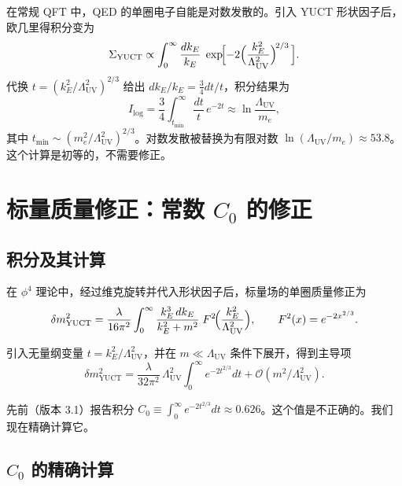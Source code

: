 \documentclass[11pt,a4paper]{article}
\newcommand{\LUV}{\Lambda_{\mathrm{UV}}}
\theoremstyle{remark}
\begin{document}
	在常规 QFT 中，QED 的单圈电子自能是对数发散的。引入 YUCT 形状因子后，欧几里得积分变为
	\begin{equation}
		\Sigma_{\mathrm{YUCT}} \propto \int_0^{\infty} \frac{dk_E}{k_E}\; \exp\!\Bigl[-2\Bigl(\frac{k_E^2}{\LUV^2}\Bigr)^{\!2/3}\,\Bigr].
		\label{eq:elec_int}
	\end{equation}
	代换 \(t = (k_E^2/\LUV^2)^{2/3}\) 给出 \(dk_E/k_E = \frac{3}{4} dt/t\)，积分结果为
	\begin{equation}
		I_{\mathrm{log}} = \frac{3}{4} \int_{t_{\min}}^{\infty} \frac{dt}{t}\, e^{-2t} \approx \ln\frac{\LUV}{m_e},
		\label{eq:elec_result}
	\end{equation}
	其中 \(t_{\min} \sim (m_e^2/\LUV^2)^{2/3}\)。对数发散被替换为有限对数 \(\ln(\LUV/m_e) \approx 53.8\)。这个计算是初等的，不需要修正。
	
	\section{标量质量修正：常数 \(C_0\) 的修正}
	\label{sec:scalar}
	
	\subsection{积分及其计算}
	
	在 \(\phi^4\) 理论中，经过维克旋转并代入形状因子后，标量场的单圈质量修正为
	\begin{equation}
		\delta m^2_{\mathrm{YUCT}} = \frac{\lambda}{16\pi^2} \int_0^{\infty} \frac{k_E^3\, dk_E}{k_E^2 + m^2}\; F^2\!\Bigl(\frac{k_E^2}{\LUV^2}\Bigr), \qquad F^2(x) = e^{-2x^{2/3}}.
		\label{eq:scalar_YUCT}
	\end{equation}
	
	引入无量纲变量 \(t = k_E^2/\LUV^2\)，并在 \(m \ll \LUV\) 条件下展开，得到主导项
	\begin{equation}
		\delta m^2_{\mathrm{YUCT}} = \frac{\lambda}{32\pi^2}\,\LUV^2 \int_0^{\infty} e^{-2t^{2/3}} dt + \mathcal{O}(m^2/\LUV^2).
		\label{eq:scalar_lead}
	\end{equation}
	
	先前（版本 3.1）报告积分 \(C_0 \equiv \int_0^{\infty} e^{-2t^{2/3}} dt \approx 0.626\)。这个值是不正确的。我们现在精确计算它。
	
	\subsection{\(C_0\) 的精确计算}
	
\end{document}
